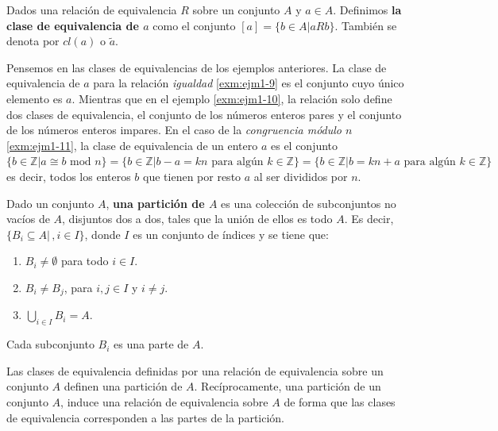\documentclass[12pt,]{krantz}
\theoremstyle{definition}
\theoremstyle{definition}
\theoremstyle{definition}
\theoremstyle{remark}
\let\BeginKnitrBlock\begin \let\EndKnitrBlock\end
\begin{document}
\BeginKnitrBlock{definition}
\protect\hypertarget{def:unnamed-chunk-24}{}{\label{def:unnamed-chunk-24}
}Dados una relación de equivalencia \(R\) sobre un conjunto \(A\) y
\(a\in A\). Definimos \textbf{la clase de equivalencia de \(a\)} como el
conjunto \([a]=\{b\in A | aRb\}\). También se denota por \(cl(a)\) o
\(\tilde{a}\).
\EndKnitrBlock{definition}

Pensemos en las clases de equivalencias de los ejemplos anteriores. La
clase de equivalencia de \(a\) para la relación \emph{igualdad}
\ref{exm:ejm1-9} es el conjunto cuyo único elemento es \(a\). Mientras
que en el ejemplo \ref{exm:ejm1-10}, la relación solo define dos clases
de equivalencia, el conjunto de los números enteros pares y el conjunto
de los números enteros impares. En el caso de la \emph{congruencia
módulo \(n\)} \ref{exm:ejm1-11}, la clase de equivalencia de un entero
\(a\) es el conjunto
\(\{b\in\mathbb{Z}| a\cong b\mbox{ mod } n \}=\{b\in\mathbb{Z}| b-a=kn\mbox{ para algún } k\in\mathbb{Z} \}=\{b\in\mathbb{Z}| b=kn+a\mbox{ para algún } k\in\mathbb{Z} \}\)
es decir, todos los enteros \(b\) que tienen por resto \(a\) al ser
divididos por \(n\).

\BeginKnitrBlock{definition}
\protect\hypertarget{def:unnamed-chunk-25}{}{\label{def:unnamed-chunk-25}
}Dado un conjunto \(A\), \textbf{una partición de \(A\)} es una
colección de subconjuntos no vacíos de \(A\), disjuntos dos a dos, tales
que la unión de ellos es todo \(A\). Es decir,
\(\{ B_{i}\subseteq A |\,, i\in I\}\), donde \(I\) es un conjunto de
índices y se tiene que:

\begin{enumerate}
\def\labelenumi{\roman{enumi})}
\item
  \(B_{i}\neq\emptyset\) para todo \(i\in I\).
\item
  \(B_{i}\neq B_{j}\), para \(i,j\in I\) y \(i\neq j\).
\item
  \(\bigcup_{i\in I} B_{i}=A\).
\end{enumerate}

Cada subconjunto \(B_{i}\) es una parte de \(A\).
\EndKnitrBlock{definition}

\BeginKnitrBlock{theorem}
\protect\hypertarget{thm:unnamed-chunk-26}{}{\label{thm:unnamed-chunk-26}
}Las clases de equivalencia definidas por una relación de equivalencia
sobre un conjunto \(A\) definen una partición de \(A\). Recíprocamente,
una partición de un conjunto \(A\), induce una relación de equivalencia
sobre \(A\) de forma que las clases de equivalencia corresponden a las
partes de la partición.
\EndKnitrBlock{theorem}
\end{document}
